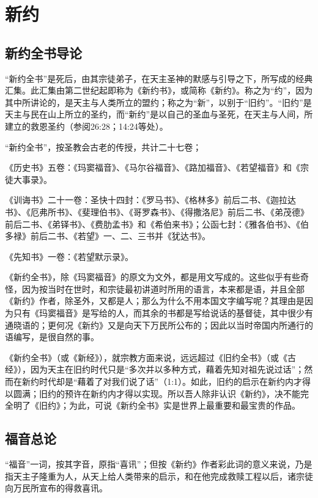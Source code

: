 \part{新约}


\chapter*{新约全书导论}
“新约全书”是死后，由其宗徒弟子，在天主圣神的默感与引导之下，所写成的经典汇集。此汇集由第二世纪起即称为《新约书》，或简称《新约》。称之为“约”，因为其中所讲论的，是天主与人类所立的盟约；称之为“新”，以别于“旧约”。“旧约”是天主与民在山上所立的圣约，而“新约”是以自己的圣血与圣死，在天主与人间，所建立的救恩圣约（参阅26:28；14:24等处）。

“新约全书”，按圣教会古老的传授，共计二十七卷；

《历史书》五卷：《玛窦福音》、《马尔谷福音》、《路加福音》、《若望福音》和《宗徒大事录》。

《训诲书》二十一卷：圣\UL[保禄]快十四封：《罗马书》、《格林多》前后二书、《迦拉达书》、《厄弗所书》、《斐理伯书》、《哥罗森书》、《得撒洛尼》前后二书、《弟茂德》前后二书、《弟铎书》、《费肋孟书》和《希伯来书》；公函七封：《雅各伯书》、《伯多禄》前后二书、《若望》一、二、三书并《犹达书》。

《先知书》一卷：《若望默示录》。

《新约全书》，除《玛窦福音》的原文为\UL[阿刺美]文外，都是用\UL[希腊]文写成的。这些似乎有些奇怪，因为按当时\UL[耶稣]在世时，和宗徒最初讲道时所用的语言，本来都是\UL[阿刺美]语，并且全部《新约》作者，除圣外，又都是\UL[犹太]人；那么为什么不用本国文字编写呢？其理由是因为只有《玛窦福音》是写给\UL[巴力斯坦]的\UL[犹太]人，而其余的书都是写给说\UL[希腊]话的基督徒，其中很少有通晓\UL[阿刺美]语的；更何况《新约》又是向天下万民所公布的；因此以当时\UL[罗马]帝国内所通行的\UL[希腊]语编写，是很自然的事。

《新约全书》（或《新经》），就宗教方面来说，远远超过《旧约全书》（或《古经》），因为天主在旧约时代只是“多次并以多种方式，藉着先知对祖先说过话”；然而在新约时代却是“藉着了对我们说了话”（1:1）。如此，旧约的启示在新约内才得以圆满；旧约的预许在新约内才得以实现。所以吾人除非认识《新约》，决不能完全明了《旧约》；为此，可说《新约全书》实是世界上最重要和最宝贵的作品。


\chapter*{福音总论}
“福音”一词，按其字音，原指“喜讯”；但按《新约》作者彩此词的意义来说，乃是指天主子隆重为人，从天上给人类带来的启示，和在他完成救赎工程以后，诸宗徒向万民所宣布的得救喜讯。

